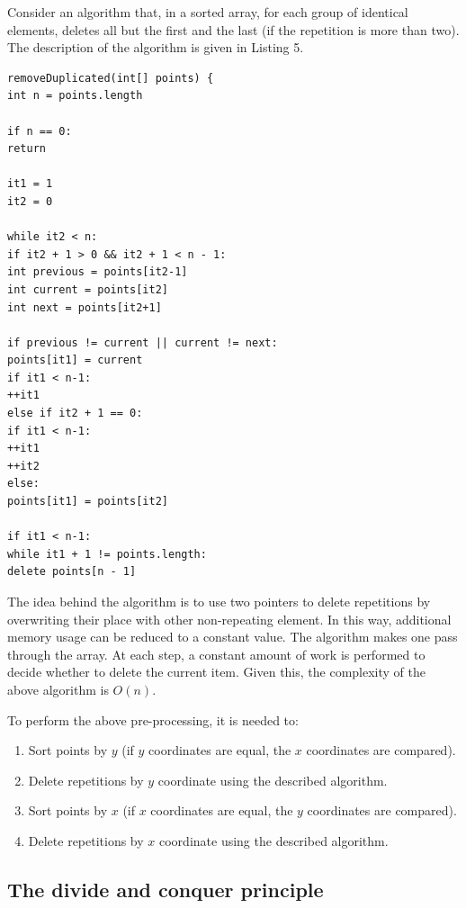 \documentclass[conference]{IEEEtran}
\theoremstyle{plane}
\begin{document}
Consider an algorithm that, in a sorted array, for each group of identical elements, deletes all but the first and the last (if the repetition is more than two). The description of the algorithm is given in Listing 5.

\begin{lstlisting}[caption={Algorithm of removing duplicates in a sorted array},captionpos=b]
removeDuplicated(int[] points) {
int n = points.length

if n == 0:
return

it1 = 1
it2 = 0

while it2 < n:
if it2 + 1 > 0 && it2 + 1 < n - 1:
int previous = points[it2-1]
int current = points[it2]
int next = points[it2+1]

if previous != current || current != next:
points[it1] = current
if it1 < n-1:
++it1
else if it2 + 1 == 0:
if it1 < n-1:
++it1
++it2
else:
points[it1] = points[it2]

if it1 < n-1:
while it1 + 1 != points.length:
delete points[n - 1]
\end{lstlisting}

The idea behind the algorithm is to use two pointers to delete repetitions by overwriting their place with other non-repeating element. In this way, additional memory usage can be reduced to a constant value. The algorithm makes one pass through the array. At each step, a constant amount of work is performed to decide whether to delete the current item. Given this, the complexity of the above algorithm is $O(n)$.

To perform the above pre-processing, it is needed to:

\begin{enumerate}
	\item
	Sort points by $y$ (if $y$ coordinates are equal, the $x$ coordinates are compared).
	\item
	Delete repetitions by $y$ coordinate using the described algorithm.
	\item
	Sort points by $x$ (if $x$ coordinates are equal, the $y$ coordinates are compared).
	\item
	Delete repetitions by $x$ coordinate using the described algorithm.
\end{enumerate}

\subsection{The divide and conquer principle}
\end{document}

